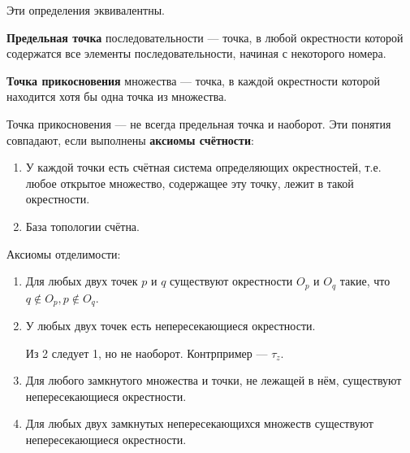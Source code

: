 Эти определения эквивалентны.

\begin{definition}
    \textbf{Предельная точка} последовательности --- точка, в любой окрестности которой содержатся все элементы последовательности, начиная с некоторого номера.
\end{definition}

\begin{definition}
    \textbf{Точка прикосновения} множества --- точка, в каждой окрестности которой находится хотя бы одна точка из множества.
\end{definition}

Точка прикосновения --- не всегда предельная точка и наоборот.
Эти понятия совпадают, если выполнены \textbf{аксиомы счётности}:
\begin{enumerate}
    \item У каждой точки есть счётная система определяющих окрестностей,
        т.е. любое открытое множество, содержащее эту точку, лежит в такой окрестности.
    \item База топологии счётна.
\end{enumerate}

Аксиомы отделимости:
\begin{enumerate}
    \item Для любых двух точек \(p\) и \(q\) существуют окрестности \(O_p\) и \(O_q\) такие, что \(q \notin O_p, p \notin O_q\).
    \item У любых двух точек есть непересекающиеся окрестности.
    \begin{remark}
        Из 2 следует 1, но не наоборот. Контрпример --- \(\tau_z\).
    \end{remark}
    \item Для любого замкнутого множества и точки, не лежащей в нём, существуют непересекающиеся окрестности.
    \item Для любых двух замкнутых непересекающихся множеств существуют непересекающиеся окрестности. 
\end{enumerate}

